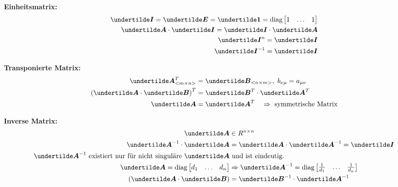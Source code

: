 \textbf{Einheitsmatrix:}
\begin{align*}
\ma{I} = \ma{E} = \ma{1} = \text{diag}\begin{bmatrix}1 & \ldots & 1\end{bmatrix}\\
\ma{A} \cdot \ma{I} = \ma{I} \cdot \ma{A}\\
\ma{I}^n = \ma{I}\\
\ma{I}^{-1} = \ma{I}
\end{align*}

\textbf{Transponierte Matrix:}
\begin{align*}
\ma{A}_{<m\times n>}^T &= \ma{B}_{<n\times m>},\ b_{\nu\mu} = a_{\mu\nu}\\
\left(\ma{A} \cdot \ma{B}\right)^T &= \ma{B}^T \cdot \ma{A}^T\\
\ma{A} &= \ma{A}^T \quad \Rightarrow \text{ symmetrische Matrix}
\end{align*}

\textbf{Inverse Matrix:}
\begin{align*}
\ma{A} &\in R^{n\times n}\\
\ma{A}^{-1} \cdot \ma{A} &= \ma{A} \cdot \ma{A}^{-1} = \ma{I}\\
\text{$\ma{A}^{-1}$ existiert nur für nicht singuläre $\ma{A}$}&\text{ und ist eindeutig.}\\
\ma{A} = \text{diag}\begin{bmatrix}d_1 & \ldots & d_n\end{bmatrix} & \Rightarrow \ma{A}^{-1} = \text{diag}\begin{bmatrix}\frac{1}{d_1} & \ldots & \frac{1}{d_n}\end{bmatrix}\\
\left(\ma{A} \cdot \ma{B}\right) &= \ma{B}^{-1} \cdot \ma{A}^{-1}
\end{align*}

